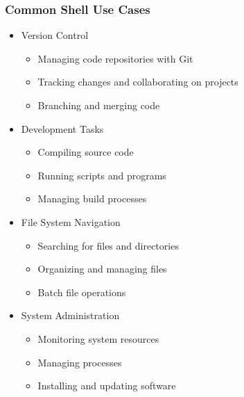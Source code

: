 \documentclass[10pt]{beamer}
\begin{document}
\begin{frame}
    \frametitle{Common Shell Use Cases}
    \begin{itemize}
        \item Version Control
        \begin{itemize}
            \item Managing code repositories with Git
            \item Tracking changes and collaborating on projects
            \item Branching and merging code
        \end{itemize}
        \item Development Tasks
        \begin{itemize}
            \item Compiling source code
            \item Running scripts and programs
            \item Managing build processes
        \end{itemize}
        \item File System Navigation
        \begin{itemize}
            \item Searching for files and directories
            \item Organizing and managing files
            \item Batch file operations
        \end{itemize}
        \item System Administration
        \begin{itemize}
            \item Monitoring system resources
            \item Managing processes
            \item Installing and updating software
        \end{itemize}
    \end{itemize}
\end{frame}
\end{document}
